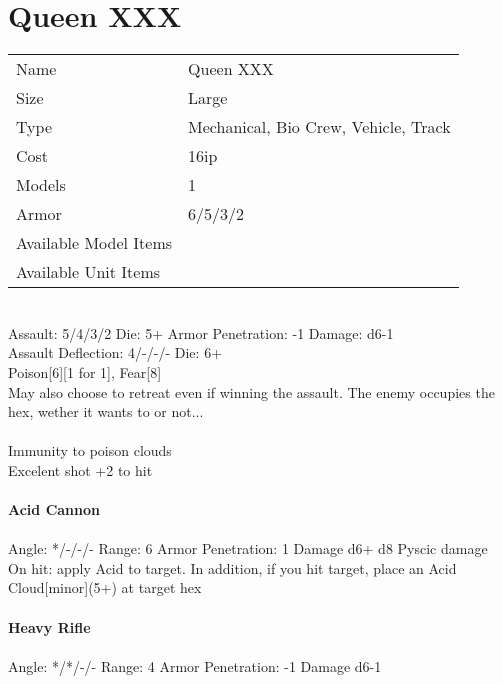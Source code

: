






\pagebreak

\section{ Queen XXX }

\begin{tabular}{ll}
  Name & Queen XXX \\
  Size & Large\\
  Type & Mechanical, Bio Crew, Vehicle, Track\\
  Cost & 16ip\\
  Models & 1\\
  Armor & 6/5/3/2\\
  Available Model Items &  \\
  Available Unit Items &  \\
\end{tabular}

\ \\
Assault: 5/4/3/2 Die: 5+ Armor Penetration: -1 Damage: d6-1 \\
Assault Deflection: 4/-/-/- Die: 6+\\
\indent Poison[6][1 for 1], Fear[8] \\ May also choose to retreat even if winning the assault. The enemy occupies the hex, wether it wants to or not... \\
\ \\
Immunity to poison clouds \\ Excelent shot +2 to hit
\ \\
\ \\
{\bf Acid Cannon } \\
\ \\
Angle: */-/-/- Range: 6 Armor Penetration: 1 Damage d6+ d8 Pyscic damage \\
\indent On hit: apply Acid to target. In addition, if you hit target, place an Acid Cloud[minor](5+) at target hex \\



\ \\
{\bf Heavy Rifle } \\
\ \\
Angle: */*/-/- Range: 4 Armor Penetration: -1 Damage d6-1 \\
\indent  \\



